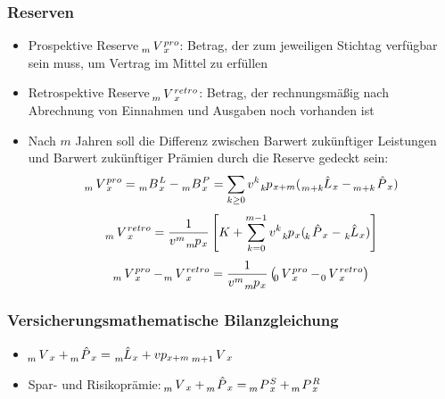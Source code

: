 \documentclass[12pt]{report}
\theoremstyle{dotless}
\theoremstyle{definition}
\begin{document}
\subsubsection{Reserven}
\begin{itemize}
	\item Prospektive Reserve $\tensor[_{m}]{V}{}_x^{pro}$: Betrag, der zum jeweiligen Stichtag verfügbar sein muss, um Vertrag im Mittel zu erfüllen
	\item Retrospektive Reserve $\tensor[_{m}]{V}{}_x^{retro}$: Betrag, der rechnungsmäßig nach Abrechnung von Einnahmen und Ausgaben noch vorhanden ist
	\item Nach $m$ Jahren soll die Differenz zwischen Barwert zukünftiger Leistungen und Barwert zukünftiger Prämien durch die Reserve gedeckt sein: 
	\begin{equation}
		\tensor[_{m}]{V}{}_x^{pro} = \tensor[_{m}]{B}{}_x^{L} - \tensor[_{m}]{B}{}_x^{P} = \sum_{k \geq 0} v^k \tensor[_{k}]{p}{}_{x+m}(\tensor[_{m+k}]{\hat{L}}{}_x - \tensor[_{m+k}]{\hat{P}}{}_x)
	\end{equation}
	\begin{equation}
		\tensor[_{m}]{V}{}_x^{retro} = \frac{1}{v^m \tensor[_{m}]{p}{}_x} \left[K+\sum_{k=0}^{m-1}v^k \tensor[_{k}]{p}{}_x (\tensor[_{k}]{\hat{P}}{}_x - \tensor[_{k}]{\hat{L}}{}_x) \right]
	\end{equation}
	\begin{equation}
		\tensor[_{m}]{V}{}_x^{pro} - \tensor[_{m}]{V}{}_x^{retro} = \frac{1}{v^m \tensor[_{m}]{p}{}_x} \left(\tensor[_{0}]{V}{}_x^{pro} - \tensor[_{0}]{V}{}_x^{retro}\right)
	\end{equation}
\end{itemize}

\subsubsection{Versicherungsmathematische Bilanzgleichung}
\begin{itemize}
	\item $\tensor[_{m}]{V}{}_x + \tensor[_{m}]{\hat{P}}{}_x = \tensor[_{m}]{\hat{L}}{}_x + vp_{x+m} \ \tensor[_{m+1}]{V}{}_x$
	\item Spar- und Risikoprämie: $\tensor[_{m}]{V}{}_x + \tensor[_{m}]{\hat{P}}{}_x = \tensor[_{m}]{P}{}_x^S + \tensor[_{m}]{P}{}_x^R$
\end{itemize}
\end{document}
